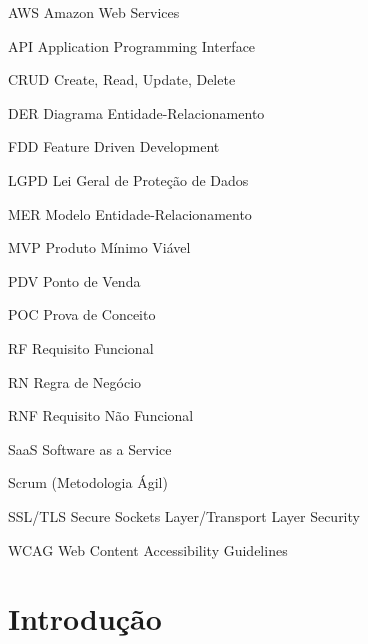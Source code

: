 \documentclass[
	12pt,				%
	openany,			%
	oneside,			%
	a4paper,			%
	english,			%
	french,				%
	spanish,			%
	brazil				%
	]{abntex2}
\begin{document}
\listoffigures*
\cleardoublepage

\listoftables*
\cleardoublepage

\begin{siglas}
  \item[AWS] Amazon Web Services
  \item[API] Application Programming Interface
  \item[CRUD] Create, Read, Update, Delete
  \item[DER] Diagrama Entidade-Relacionamento
  \item[FDD] Feature Driven Development
  \item[LGPD] Lei Geral de Proteção de Dados
  \item[MER] Modelo Entidade-Relacionamento
  \item[MVP] Produto Mínimo Viável
  \item[PDV] Ponto de Venda
  \item[POC] Prova de Conceito
  \item[RF] Requisito Funcional
  \item[RN] Regra de Negócio
  \item[RNF] Requisito Não Funcional
  \item[SaaS] Software as a Service
  \item[Scrum] (Metodologia Ágil)
  \item[SSL/TLS] Secure Sockets Layer/Transport Layer Security
  \item[WCAG] Web Content Accessibility Guidelines
\end{siglas}

\tableofcontents*
\cleardoublepage

\textual

\chapter*{Introdução}
\end{document}

